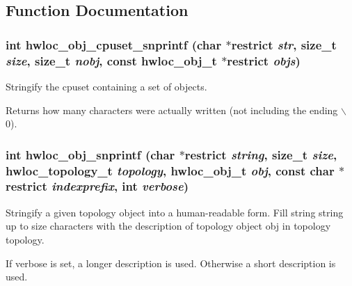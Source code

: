 \subsection{Function Documentation}
\hypertarget{group__hwlocality__conversion_gae001fafdeda3a67695d406affde1ab0d}{
\subsubsection[{hwloc\_\-obj\_\-cpuset\_\-snprintf}]{\setlength{\rightskip}{0pt plus 5cm}int hwloc\_\-obj\_\-cpuset\_\-snprintf (char $\ast$restrict {\em str}, \/  size\_\-t {\em size}, \/  size\_\-t {\em nobj}, \/  const {\bf hwloc\_\-obj\_\-t} $\ast$restrict {\em objs})}}
\label{group__hwlocality__conversion_gae001fafdeda3a67695d406affde1ab0d}


Stringify the cpuset containing a set of objects. \begin{DoxyReturn}{Returns}
how many characters were actually written (not including the ending $\backslash$0). 
\end{DoxyReturn}
\hypertarget{group__hwlocality__conversion_ga612dc210053b65d2466ac7ad39db92a4}{
\subsubsection[{hwloc\_\-obj\_\-snprintf}]{\setlength{\rightskip}{0pt plus 5cm}int hwloc\_\-obj\_\-snprintf (char $\ast$restrict {\em string}, \/  size\_\-t {\em size}, \/  {\bf hwloc\_\-topology\_\-t} {\em topology}, \/  {\bf hwloc\_\-obj\_\-t} {\em obj}, \/  const char $\ast$restrict {\em indexprefix}, \/  int {\em verbose})}}
\label{group__hwlocality__conversion_ga612dc210053b65d2466ac7ad39db92a4}


Stringify a given topology object into a human-\/readable form. Fill string {\ttfamily string} up to {\ttfamily size} characters with the description of topology object {\ttfamily obj} in topology {\ttfamily topology}.

If {\ttfamily verbose} is set, a longer description is used. Otherwise a short description is used.

